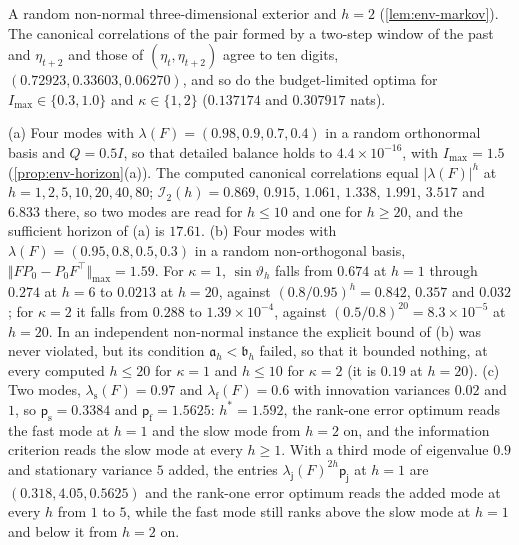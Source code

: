 \begin{numcheck}\label{chk:env-markov}
A random non-normal three-dimensional exterior and $h=2$ (\cref{lem:env-markov}). The canonical correlations of the pair formed by a two-step window of the past and $\eta_{t+2}$ and those of $(\eta_t,\eta_{t+2})$ agree to ten digits, $(0.72923,0.33603,0.06270)$, and so do the budget-limited optima for $I_{\max}\in\{0.3,1.0\}$ and $\kappa\in\{1,2\}$ ($0.137174$ and $0.307917$ nats).
\end{numcheck}

\begin{numcheck}\label{chk:env-horizon}
(a) Four modes with $\lambda(F)=(0.98,0.9,0.7,0.4)$ in a random orthonormal basis and $Q=0.5I$, so that detailed balance holds to $4.4\times10^{-16}$, with $I_{\max}=1.5$ (\cref{prop:env-horizon}(a)). The computed canonical correlations equal $\lvert\lambda(F)\rvert^h$ at $h=1,2,5,10,20,40,80$; $\mathcal I_2(h)=0.869$, $0.915$, $1.061$, $1.338$, $1.991$, $3.517$ and $6.833$ there, so two modes are read for $h\le10$ and one for $h\ge20$, and the sufficient horizon of (a) is $17.61$. (b) Four modes with $\lambda(F)=(0.95,0.8,0.5,0.3)$ in a random non-orthogonal basis, $\Vert FP_0-P_0F^\top\Vert_{\max}=1.59$. For $\kappa=1$, $\sin\vartheta_h$ falls from $0.674$ at $h=1$ through $0.274$ at $h=6$ to $0.0213$ at $h=20$, against $(0.8/0.95)^h=0.842$, $0.357$ and $0.032$; for $\kappa=2$ it falls from $0.288$ to $1.39\times10^{-4}$, against $(0.5/0.8)^{20}=8.3\times10^{-5}$ at $h=20$. In an independent non-normal instance the explicit bound of (b) was never violated, but its condition $\mathfrak a_h<\mathfrak b_h$ failed, so that it bounded nothing, at every computed $h\le20$ for $\kappa=1$ and $h\le10$ for $\kappa=2$ (it is $0.19$ at $h=20$). (c) Two modes, $\lambda_{\mathrm s}(F)=0.97$ and $\lambda_{\mathrm f}(F)=0.6$ with innovation variances $0.02$ and $1$, so $\mathsf p_{\mathrm s}=0.3384$ and $\mathsf p_{\mathrm f}=1.5625$: $h^\ast=1.592$, the rank-one error optimum reads the fast mode at $h=1$ and the slow mode from $h=2$ on, and the information criterion reads the slow mode at every $h\ge1$. With a third mode of eigenvalue $0.9$ and stationary variance $5$ added, the entries $\lambda_{\mathsf j}(F)^{2h}\mathsf p_{\mathsf j}$ at $h=1$ are $(0.318,4.05,0.5625)$ and the rank-one error optimum reads the added mode at every $h$ from $1$ to $5$, while the fast mode still ranks above the slow mode at $h=1$ and below it from $h=2$ on.
\end{numcheck}

